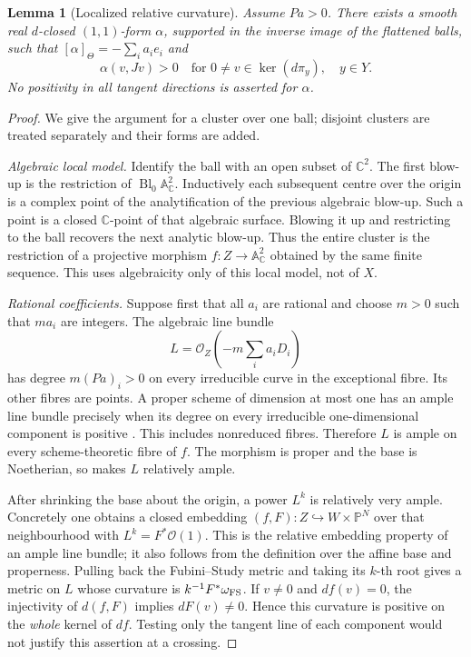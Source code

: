 \documentclass[12pt]{amsart}
\newtheorem{lem}[thm]{Lemma}
\theoremstyle{definition}
\theoremstyle{remark}
\numberwithin{equation}{section}
\newcommand{\cO}{\mathcal{O}}
\newcommand{\C}{\mathbb{C}}
\newcommand{\mP}{\mathbb{P}}
\begin{document}
\begin{lem}[Localized relative curvature]\label{lem:curvature}
Assume $Pa>0$. There exists a smooth real $d$-closed $(1,1)$-form $\alpha$, supported in the inverse image of the flattened balls, such that $[\alpha]_\Theta=-\sum_i a_i e_i$ and
\begin{equation}\label{eq:vertical}
 \alpha(v,Jv)>0\quad\text{for }0\ne v\in\ker(d\pi_y),\quad y\in Y.
\end{equation}
No positivity in all tangent directions is asserted for $\alpha$.
\end{lem}
\begin{proof}
We give the argument for a cluster over one ball; disjoint clusters are treated separately and their forms are added.

\emph{Algebraic local model.} Identify the ball with an open subset of $\C^2$. The first blow-up is the restriction of $\operatorname{Bl}_0\mathbb A^2_\C$. Inductively each subsequent centre over the origin is a complex point of the analytification of the previous algebraic blow-up. Such a point is a closed $\C$-point of that algebraic surface. Blowing it up and restricting to the ball recovers the next analytic blow-up. Thus the entire cluster is the restriction of a projective morphism $f:Z\to\mathbb A^2_\C$ obtained by the same finite sequence. This uses algebraicity only of this local model, not of $X$.

\emph{Rational coefficients.} Suppose first that all $a_i$ are rational and choose $m>0$ such that $ma_i$ are integers. The algebraic line bundle
\[
 L=\cO_Z\left(-m\sum_i a_iD_i\right)
\]
has degree $m(Pa)_i>0$ on every irreducible curve in the exceptional fibre. Its other fibres are points. A proper scheme of dimension at most one has an ample line bundle precisely when its degree on every irreducible one-dimensional component is positive \cite[Tag 0B5Y]{Stacks}. This includes nonreduced fibres. Therefore $L$ is ample on every scheme-theoretic fibre of $f$. The morphism is proper and the base is Noetherian, so \cite[Theorem 4.7.1, p.~145]{EGA} makes $L$ relatively ample.

After shrinking the base about the origin, a power $L^k$ is relatively very ample. Concretely one obtains a closed embedding $(f,F):Z\hookrightarrow W\times\mP^N$ over that neighbourhood with $L^k=F^*\cO(1)$. This is the relative embedding property of an ample line bundle; it also follows from the definition over the affine base and properness. Pulling back the Fubini--Study metric and taking its $k$-th root gives a metric on $L$ whose curvature is $k^{-1}F^*\omega_{\rm FS}$. If $v\ne0$ and $df(v)=0$, the injectivity of $d(f,F)$ implies $dF(v)\ne0$. Hence this curvature is positive on the \emph{whole} kernel of $df$. Testing only the tangent line of each component would not justify this assertion at a crossing.


\end{proof}
\end{document}
